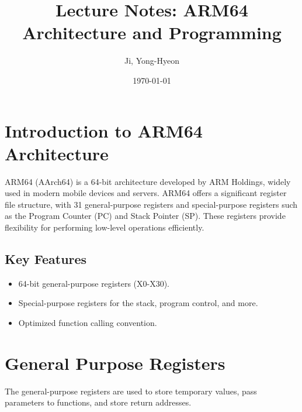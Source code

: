 \documentclass[12pt]{article}
\begin{document}
	
	\title{Lecture Notes: ARM64 Architecture and Programming}
	\author{Ji, Yong-Hyeon}
	\date{\today}
	\maketitle
	
	\tableofcontents  %
	\newpage
	
	\section{Introduction to ARM64 Architecture}
	ARM64 (AArch64) is a 64-bit architecture developed by ARM Holdings, widely used in modern mobile devices and servers. ARM64 offers a significant register file structure, with 31 general-purpose registers and special-purpose registers such as the Program Counter (PC) and Stack Pointer (SP). These registers provide flexibility for performing low-level operations efficiently.
	
	\subsection{Key Features}
	\begin{itemize}
		\item 64-bit general-purpose registers (X0-X30).
		\item Special-purpose registers for the stack, program control, and more.
		\item Optimized function calling convention.
	\end{itemize}
	
	\section{General Purpose Registers}
	The general-purpose registers are used to store temporary values, pass parameters to functions, and store return addresses.
	
\end{document}

